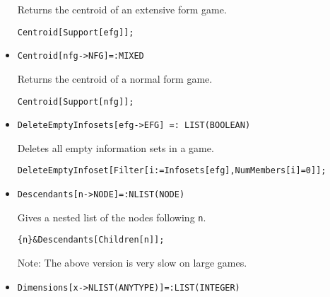 \begin{itemize}
\bd 
Returns the centroid of an extensive form game.  
\begin{verbatim}
Centroid[Support[efg]];
\end{verbatim} 
\ed

\item{}
\protect \large \begin{verbatim}
Centroid[nfg->NFG]=:MIXED
\end{verbatim}\normalsize

\bd 
Returns the centroid of a normal form game.  
\begin{verbatim}
Centroid[Support[nfg]];
\end{verbatim} 
\ed



\item{}
\protect \large \begin{verbatim}
DeleteEmptyInfosets[efg->EFG] =: LIST(BOOLEAN)
\end{verbatim}\normalsize

\bd 
Deletes all empty information sets in a game.  
\begin{verbatim}
DeleteEmptyInfoset[Filter[i:=Infosets[efg],NumMembers[i]=0]];
\end{verbatim} 
\ed

\item{}
\protect \large \begin{verbatim}
Descendants[n->NODE]=:NLIST(NODE)
\end{verbatim}\normalsize

\bd 
Gives a nested list of the nodes following \verb+n+.
\begin{verbatim}
{n}&Descendants[Children[n]];
\end{verbatim} 
\item[Note:] The above version is very slow on large games.
\ed

\item{}
\protect \large \begin{verbatim}
Dimensions[x->NLIST(ANYTYPE)]=:LIST(INTEGER)
\end{verbatim}\normalsize


\end{itemize}

